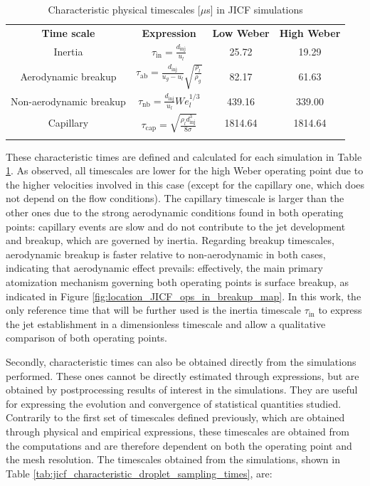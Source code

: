 \begin{table}[!h]
\centering
\caption{Characteristic physical timescales [$\mu$s] in JICF simulations}
\begin{tabular}{cccc}
\thickhline
\textbf{Time scale} & \textbf{Expression} & \textbf{Low Weber} & \textbf{High Weber} \\
\thickhline
Inertia & $\tau_\mathrm{in} = \frac{d_\mathrm{inj}}{u_l}$ & 25.72 & 19.29 \\
Aerodynamic breakup  &  $\tau_\mathrm{ab} =  \frac{d_\mathrm{inj}}{u_g - u_l} \sqrt{\frac{\rho_l}{\rho_g}} $ & 82.17 & 61.63 \\
Non-aerodynamic breakup  &  $\tau_\mathrm{nb} = \frac{d_\mathrm{inj}}{u_l} We_l^{1/3} $ &  439.16 & 339.00 \\
Capillary & $\tau_\mathrm{cap} = \sqrt{\frac{\rho_l d_\mathrm{inj}^3}{8 \sigma}}$ & 1814.64 & 1814.64 \\
\thickhline
\end{tabular}
\label{tab:jicf_characteristic times}
\end{table}


These characteristic times are defined and calculated for each simulation in Table \ref{tab:jicf_characteristic times}. As observed, all timescales are lower for the high Weber operating point due to the higher velocities involved in this case (except for the capillary one, which does not depend on the flow conditions). The capillary timescale is larger than the other ones due to the strong aerodynamic conditions found in both operating points: capillary events are slow and do not contribute to the jet development and breakup, which are governed by inertia. Regarding breakup timescales, aerodynamic breakup is faster relative to non-aerodynamic in both cases, indicating that aerodynamic effect prevails: effectively, the main primary atomization mechanism governing both operating points is surface breakup, as indicated in Figure \ref{fig:location_JICF_ops_in_breakup_map}. In this work, the only reference time that will be further used is the inertia timescale $\tau_\mathrm{in}$ to express the jet establishment in a dimensionless timescale and allow a qualitative comparison of both operating points. 

Secondly, characteristic times can also be obtained directly from the simulations performed. These ones cannot be directly estimated through expressions, but are obtained by postprocessing results of interest in the simulations. They are useful for expressing the evolution and convergence of statistical quantities studied. Contrarily to the first set of timescales defined previously, which are obtained through physical and empirical expressions, these timescales are obtained from the computations and are therefore dependent on both the operating point and the mesh resolution. The timescales obtained from the simulations, shown in Table \ref{tab:jicf_characteristic_droplet_sampling_times}, are: 

